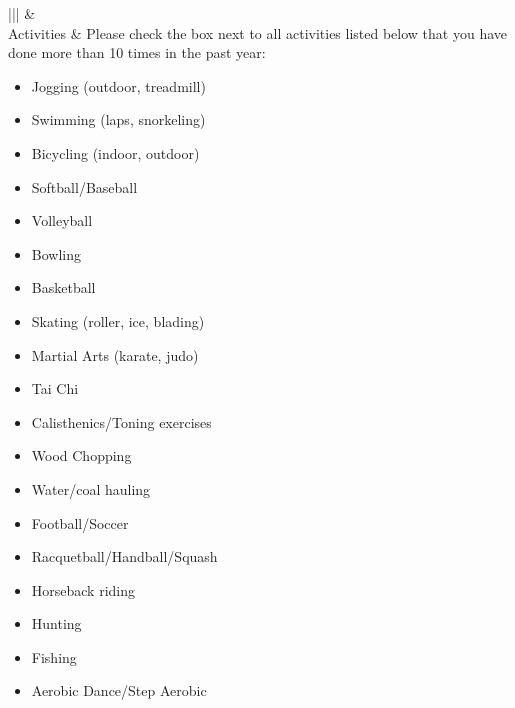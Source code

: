 \documentclass[letterpaper,10pt,english]{sphinxmanual}
\begin{document}
\begin{savenotes}\sphinxattablestart
\centering
\begin{tabular}[t]{|*{2}{|}}
\hline
{}\relax &\relax \\
\hline
Activities
&
Please check the box next to all activities listed below that you have done more than 10 times in the past year:
\begin{itemize}
\item {} 
Jogging (outdoor, treadmill)

\item {} 
Swimming (laps, snorkeling)

\item {} 
Bicycling (indoor, outdoor)

\item {} 
Softball/Baseball

\item {} 
Volleyball

\item {} 
Bowling

\item {} 
Basketball

\item {} 
Skating (roller, ice, blading)

\item {} 
Martial Arts (karate, judo)

\item {} 
Tai Chi

\item {} 
Calisthenics/Toning exercises

\item {} 
Wood Chopping

\item {} 
Water/coal hauling

\item {} 
Football/Soccer

\item {} 
Racquetball/Handball/Squash

\item {} 
Horseback riding

\item {} 
Hunting

\item {} 
Fishing

\item {} 
Aerobic Dance/Step Aerobic


\end{itemize}
\end{tabular}
\end{savenotes}
\end{document}
